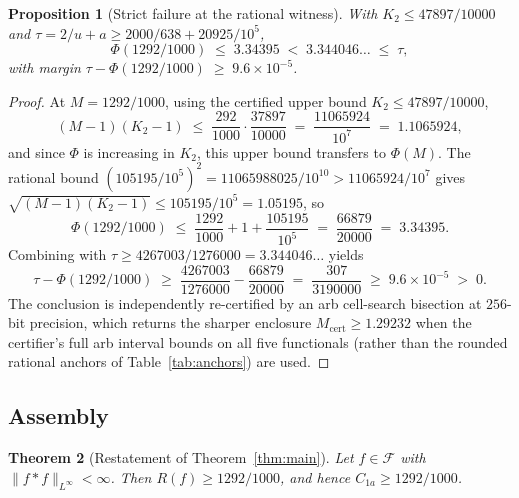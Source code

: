 \documentclass[11pt, letterpaper]{article}
\theoremstyle{paperplain}
\newtheorem{theorem}{Theorem}[section]
\newtheorem{proposition}[theorem]{Proposition}
\theoremstyle{paperdef}
\newcommand{\Linf}{L^\infty}
\newcommand{\Mcert}{M_{\mathrm{cert}}}
\begin{document}
\begin{proposition}[Strict failure at the rational witness]
\label{prop:fail}
With $K_2\le 47897/10000$ and $\tau=2/u+a\ge 2000/638+20925/10^{5}$,
\begin{equation}\label{eq:strict}
  \Phi(1292/1000) \;\le\; 3.34395
  \;<\; 3.344046\ldots \;\le\; \tau,
\end{equation}
with margin $\tau-\Phi(1292/1000)\;\ge\; 9.6\times 10^{-5}$.
\end{proposition}

\begin{proof}
At $M=1292/1000$, using the certified upper bound $K_2\le 47897/10000$,
\[
  (M-1)(K_2-1) \;\le\; \frac{292}{1000}\cdot\frac{37897}{10000}
  \;=\; \frac{11065924}{10^{7}}
  \;=\; 1.1065924,
\]
and since $\Phi$ is increasing in $K_2$, this upper bound transfers
to $\Phi(M)$.  The rational bound
$(105195/10^{5})^{2}=11065988025/10^{10}>11065924/10^{7}$
gives $\sqrt{(M-1)(K_2-1)}\le 105195/10^{5}=1.05195$, so
\[
  \Phi(1292/1000)
  \;\le\; \frac{1292}{1000} + 1 + \frac{105195}{10^{5}}
  \;=\; \frac{66879}{20000}
  \;=\; 3.34395.
\]
Combining with $\tau\ge 4267003/1276000=3.344046\ldots$ yields
\[
  \tau-\Phi(1292/1000)
  \;\ge\; \frac{4267003}{1276000} - \frac{66879}{20000}
  \;=\; \frac{307}{3190000}
  \;\ge\; 9.6\times 10^{-5}\;>\;0.
\]
The conclusion is independently re-certified by an arb cell-search
bisection at $256$-bit precision, which returns the sharper enclosure
$\Mcert\ge 1.29232$ when the certifier's full arb interval bounds on
all five functionals (rather than the rounded rational anchors of
Table~\ref{tab:anchors}) are used.
\end{proof}

\subsection{Assembly}\label{subsec:proof-assembly}

\begin{theorem}[Restatement of Theorem~\ref{thm:main}]
\label{thm:main-restated}
Let $f\in\mathcal{F}$ with $\|f*f\|_{\Linf}<\infty$.  Then
$R(f)\ge 1292/1000$, and hence $C_{1a}\ge 1292/1000$.
\end{theorem}
\end{document}
